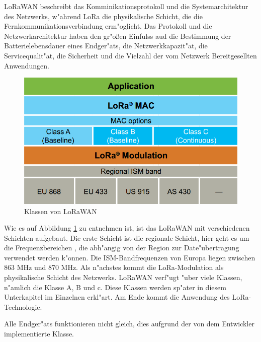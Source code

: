 LoRaWAN beschreibt das Komminikationsprotokoll und die 
Systemarchitektur des Netzwerks, w"ahrend LoRa die physikalische 
Schicht, die die Fernkommunikationsverbindung erm"oglicht. Das 
Protokoll und die Netzwerkarchitektur haben den gr"o\ss{}en Einfulss 
aud die Bestimmung der Batterielebensdauer eines Endger"ats, die 
Netzwerkkapazit"at, die Servicequalit"at, die Sicherheit und die 
Vielzahl der vom Netzwerk Bereitgesellten Anwendungen. 

\begin{figure}[h]
	\centering
	\includegraphics[width=13.5cm]{source/images/LoRa_MAC}
	\caption{Klassen von LoRaWAN \cite{LoRaWAN}\label{fig:LoRaMAC}}
\end{figure}

Wie es auf Abbildung \ref{fig:LoRaMAC} zu entnehmen ist, ist das 
LoRaWAN mit verschiedenen Schichten aufgebaut. Die erste Schicht ist 
die regionale Schicht, hier geht es um die Frequenzbereichen , die 
abh"angig von der Region zur Date"ubertragung verwendet werden k"onnen. 
Die ISM-Bandfrequenzen von Europa liegen zwischen 863 MHz und 870 MHz.
Als n"achstes kommt die LoRa-Modulation als physikalische Schicht des 
Netzwerks. LoRaWAN verf"ugt "uber viele Klassen, n"amlich die Klasse A, 
B und c. Diese Klassen werden sp"ater in diesem Unterkapitel im 
Einzelnen erkl"art. Am Ende kommt die Anwendung des LoRa-Technologie.

Alle Endger"ats funktionieren nicht gleich, dies aufgrund der von dem 
Entwickler implementierte Klasse.

